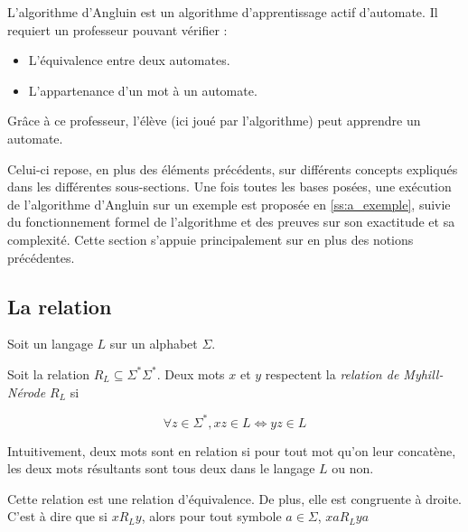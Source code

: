 L'algorithme d'Angluin est un algorithme d'apprentissage actif d'automate. Il requiert un professeur pouvant vérifier :
\begin{itemize}
	\item L'équivalence entre deux automates.
	\item L'appartenance d'un mot à un automate.
\end{itemize}
Grâce à ce professeur, l'élève (ici joué par l'algorithme) peut apprendre un automate.

Celui-ci repose, en plus des éléments précédents, sur différents concepts expliqués dans les différentes sous-sections. Une fois toutes les bases posées, une exécution de l'algorithme d'Angluin sur un exemple est proposée en \ref{ss:a_exemple}, suivie du fonctionnement formel de l'algorithme et des preuves sur son exactitude et sa complexité. Cette section s'appuie principalement sur \cite{Neider14} en plus des notions précédentes.



\subsection{La relation \rl}

Soit un langage $L$ sur un alphabet $\Sigma$.

Soit la relation $R_L\subseteq\Sigma^*\Sigma^*$. Deux mots $x$ et $y$ respectent la \emph{relation de Myhill-Nérode $R_L$} si

$$\forall z \in \Sigma^*, xz \in L \Leftrightarrow yz \in L$$

Intuitivement, deux mots sont en relation si pour tout mot qu'on leur concatène, les deux mots résultants sont tous deux dans le langage $L$ ou non.

\begin{lemma}
	Cette relation est une relation d'équivalence. De plus, elle est congruente à droite. C'est à dire que si $xR_Ly$, alors pour tout symbole $a \in \Sigma$, $xaR_Lya$
\end{lemma}


